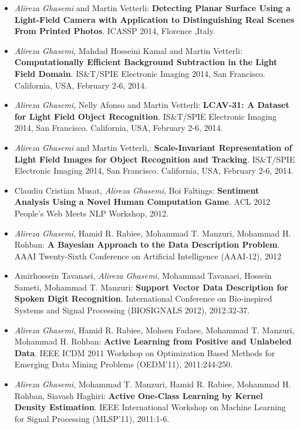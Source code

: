 \documentclass[11pt,a4paper,sans]{moderncv}        %
\begin{document}
{
\begin{itemize}


\item \textit{Alireza Ghasemi} and Martin Vetterli:\textbf{ Detecting Planar Surface Using a Light-Field Camera with Application
to Distinguishing Real Scenes From Printed Photos}.  ICASSP 2014, Florence ,Italy.

\item \textit{Alireza Ghasemi}, Mahdad Hosseini Kamal  and Martin Vetterli: \textbf{Computationally Efficient Background Subtraction in the Light Field Domain}.  IS\&T/SPIE Electronic Imaging 2014, San Francisco. California, USA, February 2-6, 2014.

\item \textit{Alireza Ghasemi}, Nelly Afonso  and Martin Vetterli: \textbf{LCAV-31: A Dataset for Light Field Object Recognition}.  IS\&T/SPIE Electronic Imaging 2014, San Francisco. California, USA, February 2-6, 2014.

\item \textit{Alireza Ghasemi} and Martin Vetterli,: \textbf{Scale-Invariant Representation of Light Field Images for Object Recognition and Tracking}.  IS\&T/SPIE Electronic Imaging 2014, San Francisco. California, USA, February 2-6, 2014.



\item Claudiu Cristian Musat, \textit{Alireza Ghasemi}, Boi Faltings: \textbf{Sentiment Analysis Using a Novel Human Computation Game}.  ACL 2012 People's Web Meets NLP Workshop, 2012.

\item \textit{Alireza Ghasemi}, Hamid R. Rabiee,  Mohammad T. Manzuri, Mohammad H. Rohban:\textbf{ A Bayesian Approach to the Data Description Problem}.  AAAI Twenty-Sixth Conference on Artificial Intelligence (AAAI-12), 2012

\item Amirhossein Tavanaei,\textit{ Alireza Ghasemi}, Mohammad Tavanaei, Hossein Sameti, Mohammad T. Manzuri: \textbf{Support Vector Data Description for Spoken Digit Recognition}. International Conference on Bio-inspired Systems and Signal Processing (BIOSIGNALS 2012), 2012:32-37.

\item \textit{Alireza Ghasemi}, Hamid R. Rabiee, Mohsen Fadaee, Mohammad T. Manzuri, Mohammad H. Rohban:\textbf{ Active Learning from Positive and Unlabeled Data}. IEEE ICDM 2011 Workshop on Optimization Based Methods for Emerging Data Mining Problems (OEDM'11), 2011:244-250.

\item \textit{Alireza Ghasemi}, Mohammad T. Manzuri, Hamid R. Rabiee, Mohammad H. Rohban, Siavash Haghiri: \textbf{Active One-Class Learning by Kernel Density Estimation}. IEEE International Workshop on Machine Learning for Signal Processing (MLSP'11), 2011:1-6.
\vspace*{5pt}

\end{itemize}
}
\end{document}
